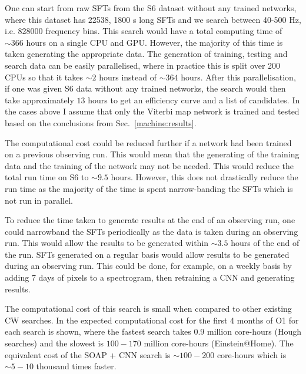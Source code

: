 %
One can start from raw \glspl{SFT} from the S6 dataset without any trained networks, where this dataset has 22538, 1800 s long \glspl{SFT} and we search between 40-500 Hz, i.e. 828000 frequency bins. 
This search would have a total computing time of $ \sim 366$ hours on a single \gls{CPU} and \gls{GPU}.
However, the majority of this time is taken generating the appropriate data.
The generation of training, testing and search data can be easily parallelised, where in practice this is split over 200 \glspl{CPU} so that it takes $\sim 2$ hours instead of $\sim 364$ hours. 
After this parallelisation, if one was given S6 data without any trained networks, the search would then take approximately $13$ hours to get an efficiency curve and a list of candidates. In the cases above I assume that only the Viterbi map network is trained and tested based on the conclusions from Sec.~\ref{machine:results}. 

The computational cost could be reduced further if a network had been trained on a previous observing run. 
This would mean that the generating of the training data and the training of the network may not be needed.
This would reduce the total run time on S6 to $\sim 9.5$ hours. 
However, this does not drastically reduce the run time as the majority of the time is spent narrow-banding the \glspl{SFT} which is not run in parallel.

To reduce the time taken to generate results at the end of an observing run, one could narrowband the \glspl{SFT} periodically as the data is taken during an observing run. 
This would allow the results to be generated within $\sim 3.5$ hours of the end of the run.
\glspl{SFT} generated on a regular basis would allow results to be generated during an observing run.
This could be done, for example, on a weekly basis by adding 7 days of pixels to a spectrogram, then retraining a \gls{CNN} and generating results.

The computational cost of this search is small when compared to other existing \gls{CW} searches. In \cite{walsh2016ComparisonMethods} the expected computational cost for the first 4 months of O1 for each search is shown, where the fastest search takes $0.9$ million core-hours (Hough searches) and the slowest is $100-170$ million core-hours (Einstein@Home).
The equivalent cost of the SOAP + \gls{CNN} search is $\sim 100-200$ core-hours which is $\sim 5-10$ thousand times faster.

\clearpage


